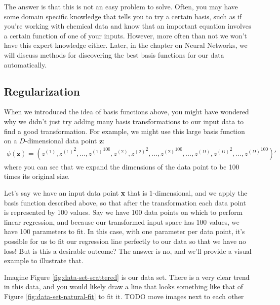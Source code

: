 The answer is that this is not an easy problem to solve. Often, you may have some domain specific knowledge that tells you to try a certain basis, such as if you're working with chemical data and know that an important equation involves a certain function of one of your inputs. However, more often than not we won't have this expert knowledge either. Later, in the chapter on Neural Networks, we will discuss methods for discovering the best basis functions for our data automatically.

\subsection{Regularization}
When we introduced the idea of basis functions above, you might have wondered why we didn't just try adding many basis transformations to our input data to find a good transformation. For example, we might use this large basis function on a $D$-dimensional data point $\textbf{z}$:
\begin{align*}
    \phi(\textbf{z}) = (z^{(1)}, {z^{(1)}}^{2}, ..., {z^{(1)}}^{100}, z^{(2)}, {z^{(2)}}^{2}, ..., {z^{(2)}}^{100}, ..., z^{(D)}, {z^{(D)}}^{2}, ..., {z^{(D)}}^{100})'
\end{align*}
where you can see that we expand the dimensions of the data point to be 100 times its original size.

Let's say we have an input data point \textbf{x} that is 1-dimensional, and we apply the basis function described above, so that after the transformation each data point is represented by 100 values. Say we have 100 data points on which to perform linear regression, and because our transformed input space has 100 values, we have 100 parameters to fit. In this case, with one parameter per data point, it's possible for us to fit our regression line perfectly to our data so that we have no loss! But is this a desirable outcome? The answer is no, and we'll provide a visual example to illustrate that.

Imagine Figure \ref{fig:data-set-scattered} is our data set. There is a very clear trend in this data, and you would likely draw a line that looks something like that of Figure \ref{fig:data-set-natural-fit} to fit it. TODO move images next to each other


